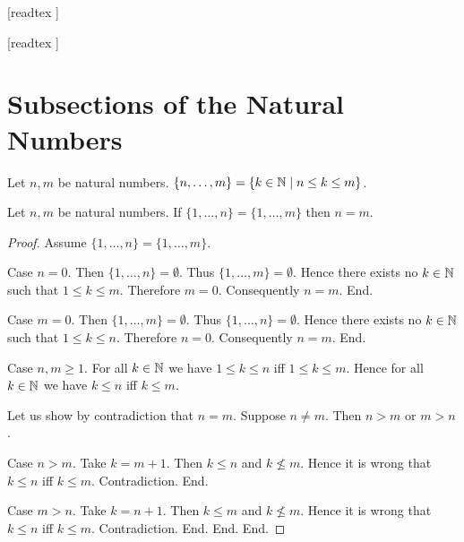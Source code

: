 \documentclass[10pt]{article}
\begin{document}
  \begin{imports}
    \begin{forthel}

      [readtex ]

      [readtex ]

    \end{forthel}
  \end{imports}


  \section{Subsections of the Natural Numbers}

  \begin{forthel}
    \begin{definition}
      Let $n, m$ be natural numbers.
      $\{ n, \dots, m \} = \{ k \in \mathbb{N} \mid n \leq k \leq m \}$.
    \end{definition}
  \end{forthel}

  \begin{forthel}
    \begin{proposition}
      Let $n, m$ be natural numbers.
      If $\{ 1, \dots, n \} = \{ 1, \dots, m \}$ then $n = m$.
    \end{proposition}
    \begin{proof}
      Assume $\{ 1, \dots, n \} = \{ 1, \dots, m \}$.

      Case $n = 0$.
        Then $\{ 1, \dots, n \} = \emptyset$.
        Thus $\{ 1, \dots, m \} = \emptyset$.
        Hence there exists no $k \in \mathbb{N}$ such that $1 \leq k \leq m$.
        Therefore $m = 0$.
        Consequently $n = m$.
      End.

      Case $m = 0$.
        Then $\{ 1, \dots, m \} = \emptyset$.
        Thus $\{ 1, \dots, n \} = \emptyset$.
        Hence there exists no $k \in \mathbb{N}$ such that $1 \leq k \leq n$.
        Therefore $n = 0$.
        Consequently $n = m$.
      End.

      Case $n, m \geq 1$.
        For all $k \in \mathbb{N}$ we have $1 \leq k \leq n$ iff $1 \leq k \leq m$.
        Hence for all $k \in \mathbb{N}$ we have $k \leq n$ iff $k \leq m$.

        Let us show by contradiction that $n = m$.
          Suppose $n \neq m$.
          Then $n > m$ or $m > n$.

          Case $n > m$.
            Take $k = m + 1$.
            Then $k \leq n$ and $k \nleq m$.
            Hence it is wrong that $k \leq n$ iff $k \leq m$.
            Contradiction.
          End.

          Case $m > n$.
            Take $k = n + 1$.
            Then $k \leq m$ and $k \nleq m$.
            Hence it is wrong that $k \leq n$ iff $k \leq m$.
            Contradiction.
          End.
        End.
      End.
    \end{proof}
  \end{forthel}
\end{document}
